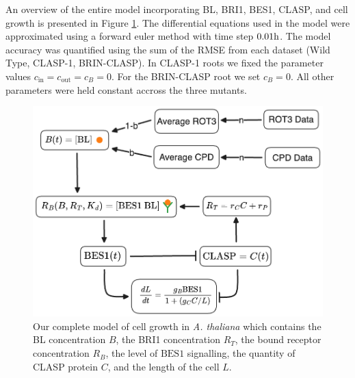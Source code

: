 An overview of the entire model incorporating BL, BRI1, BES1, CLASP, and cell growth is presented in Figure \ref{fig:clasp-model}. The differential equations used in the model were approximated using a forward euler method with time step $0.01\h$. The model accuracy was quantified using the sum of the RMSE from each dataset (Wild Type, CLASP-1, BRIN-CLASP). In CLASP-1 roots we fixed the parameter values $c_{\text{in}} = c_{\text{out}} = c_{B} = 0$. For the BRIN-CLASP root we set $c_{B} = 0$. All other parameters were held constant accross the three mutants.

\begin{figure}
    \centering
    \includegraphics[width=13cm]{img/clasp-model.png}
    \caption{Our complete model of cell growth in \emph{A. thaliana} which contains the BL concentration $B$, the BRI1 concentration $R_{T}$, the bound receptor concentration $R_{B}$, the level of $\text{BES1}$ signalling, the quantity of CLASP protein $C$, and the length of the cell $L$.}
    \label{fig:clasp-model}
\end{figure}


